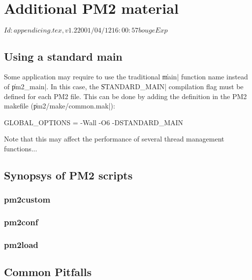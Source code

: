 \chapter{Additional PM2 material}

\stamp $Id: appendicing.tex,v 1.2 2001/04/12 16:00:57 bouge Exp $

\section{Using a standard main}
\label{sec:tradimain}

Some application may require to use the traditional \|main| function
name instead of \|pm2_main|. In this case, the \|STANDARD_MAIN|
compilation flag must be defined for each PM2 file. This can be done
by adding the definition in the PM2 makefile (\|pm2/make/common.mak|):

\begin{small}
\begin{makefile}
   GLOBAL_OPTIONS   =   -Wall -O6 -DSTANDARD_MAIN
\end{makefile}
\end{small}

Note that this may affect the performance of several thread management
functions...

\section{Synopsys of PM2 scripts}
\label{sec:scripts}

\subsection{pm2custom}

\subsection{pm2conf}

\subsection{pm2load}

\section{Common Pitfalls}
\label{sec:commonpitfalls}

